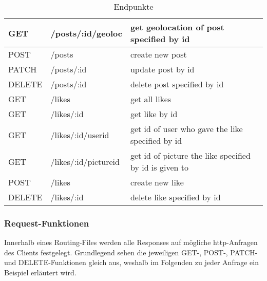 \begin{table}[!htb]
\begin{tabularx}{\textwidth}{|x|X|X|}
    \hline
    GET & /posts/:id/geoloc & get geolocation of post specified by id\\
    \hline
    POST & /posts & create new post\\
    \hline
    PATCH & /posts/:id & update post by id\\
    \hline
    DELETE & /posts/:id & delete post specified by id\\
    \hline
    \hline
    GET & /likes & get all likes\\
    \hline
    GET & /likes/:id & get like by id\\
    \hline
    GET & /likes/:id/userid & get id of user who gave the like specified by id \\
    \hline
    GET & /likes/:id/pictureid & get id of picture the like specified by id is given to\\
    \hline
    POST & /likes & create new like\\
    \hline
    DELETE & /likes/:id & delete like specified by id\\
    \hline
\end{tabularx}
\caption{Endpunkte}
\label{endpunkte}
\end{table}

\subsubsection{Request-Funktionen}
Innerhalb eines Routing-Files werden alle Responses auf mögliche http-Anfragen des Clients festgelegt. Grundlegend sehen die jeweiligen GET-, POST-, PATCH- und DELETE-Funktionen gleich aus, weshalb im Folgenden zu jeder Anfrage ein Beispiel erläutert wird.
